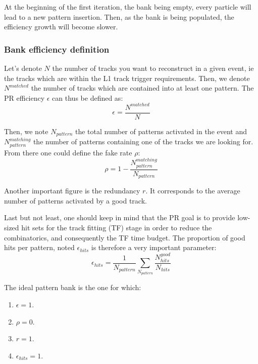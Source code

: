 \noindent At the beginning of the first iteration, the bank being empty, every particle will lead to a new pattern insertion. Then, as the bank is being populated, the efficiency growth will become slower.

\subsubsection{Bank efficiency definition}

\noindent Let's denote $N$ the number of tracks you want to reconstruct in a given event, ie the tracks which are within the L1 track trigger requirements. Then, we denote $N^{matched}$ the number of tracks which are contained into at least one pattern. The PR efficiency $\epsilon$ can thus be defined as: 
\begin{equation}
\epsilon = \frac{N^{matched}}{N}
\end{equation} 

\noindent Then, we note $N_{pattern}$ the total number of patterns activated in the event and $N^{matching}_{pattern}$ the number of patterns containing one of the tracks we are looking for. From there one could define the fake rate $\rho$:
\begin{equation}
\rho = 1 - \frac{N^{matching}_{pattern}}{N_{pattern}}
\end{equation} 

\noindent Another important figure is the redundancy $r$. It corresponds to the average number of patterns activated by a good track. 

\noindent Last but not least, one should keep in mind that the PR goal is to provide low-sized hit sets for the track fitting (TF) stage in order to reduce the combinatorics, and consequently the TF time budget. The proportion of good hits per pattern, noted $\epsilon_{hits}$ is therefore a very important parameter:
\begin{equation}
\epsilon_{hits} = \frac{1}{N_{pattern}}\sum_{N_{pattern}}\frac{N_{hits}^{good}}{N_{hits}}
\end{equation} 

\noindent The ideal pattern bank is the one for which:  
\begin{enumerate}
\item $\epsilon = 1$.
\item $\rho = 0$.
\item $r = 1$.
\item $\epsilon_{hits} = 1$. 
\end{enumerate}  

